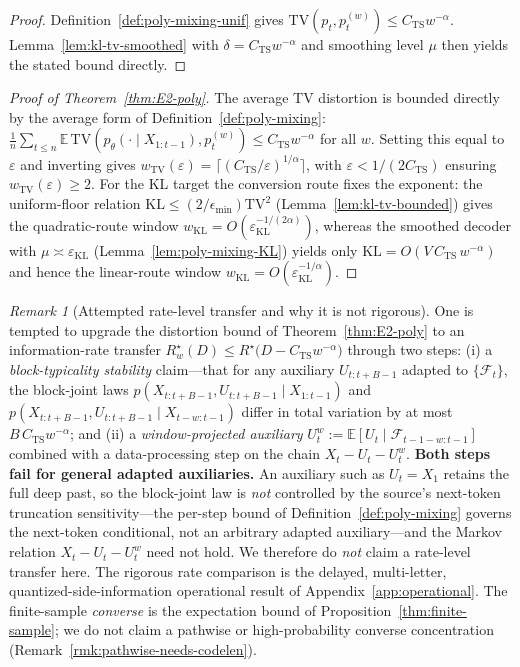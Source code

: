 \documentclass[11pt]{article}
\newcommand{\E}{\mathbb{E}}
\newcommand{\F}{\mathcal{F}}
\newcommand{\KLs}{\mathrm{KL}}
\newcommand{\TV}{\mathrm{TV}}
\theoremstyle{plain}
\theoremstyle{definition}
\theoremstyle{remark}
\newtheorem{remark}[theorem]{Remark}
\begin{document}
\begin{proof}
Definition~\ref{def:poly-mixing-unif} gives
$\TV(p_t, p_t^{(w)}) \leq C_{\mathrm{TS}} w^{-\alpha}$.
Lemma~\ref{lem:kl-tv-smoothed} with $\delta = C_{\mathrm{TS}}
w^{-\alpha}$ and smoothing level $\mu$ then yields the stated
bound directly.
\end{proof}

\begin{proof}[Proof of Theorem~\ref{thm:E2-poly}]
The average TV distortion is bounded directly by the average form of
Definition~\ref{def:poly-mixing}:
$\frac1n\sum_{t\le n}\E\,\TV(p_\theta(\cdot\mid X_{1:t-1}), p_t^{(w)}) \le
C_{\mathrm{TS}} w^{-\alpha}$ for all $w$. Setting this equal to
$\varepsilon$ and inverting gives
$w_{\TV}(\varepsilon)=\lceil (C_{\mathrm{TS}}/\varepsilon)^{1/\alpha}\rceil$,
with $\varepsilon<1/(2C_{\mathrm{TS}})$ ensuring $w_{\TV}(\varepsilon)\ge2$.
For the KL target the conversion route fixes the exponent: the
uniform-floor relation $\KLs \le (2/\epsilon_{\min})\TV^2$
(Lemma~\ref{lem:kl-tv-bounded}) gives the quadratic-route window
$w_{\KLs} = O(\varepsilon_{\KLs}^{-1/(2\alpha)})$, whereas the smoothed
decoder with $\mu \asymp \varepsilon_{\KLs}$
(Lemma~\ref{lem:poly-mixing-KL}) yields only
$\KLs = O(V\,C_{\mathrm{TS}}\,w^{-\alpha})$ and hence the linear-route
window $w_{\KLs} = O(\varepsilon_{\KLs}^{-1/\alpha})$.
\end{proof}

\begin{remark}[Attempted rate-level transfer and why it is not rigorous]
\label{rmk:failed-rate-transfer}
One is tempted to upgrade the distortion bound of
Theorem~\ref{thm:E2-poly} to an information-rate transfer
$R^\star_w(D)\le R^\star\!\bigl(D-C_{\mathrm{TS}}w^{-\alpha}\bigr)$ through
two steps: (i) a \emph{block-typicality stability} claim---that for any
auxiliary $U_{t:t+B-1}$ adapted to $\{\F_t\}$, the block-joint laws
$p(X_{t:t+B-1},U_{t:t+B-1}\mid X_{1:t-1})$ and
$p(X_{t:t+B-1},U_{t:t+B-1}\mid X_{t-w:t-1})$ differ in total variation by
at most $B\,C_{\mathrm{TS}}w^{-\alpha}$; and (ii) a \emph{window-projected
auxiliary} $U_t^w:=\E[U_t\mid\F_{t-1-w:t-1}]$ combined with a
data-processing step on the chain $X_t-U_t-U_t^w$. \textbf{Both steps fail
for general adapted auxiliaries.} An auxiliary such as $U_t=X_1$ retains
the full deep past, so the block-joint law is \emph{not} controlled by the
source's next-token truncation sensitivity---the per-step bound of
Definition~\ref{def:poly-mixing} governs the next-token conditional, not an
arbitrary adapted auxiliary---and the Markov relation $X_t-U_t-U_t^w$ need
not hold. We therefore do \emph{not} claim a rate-level transfer here. The
rigorous rate comparison is the delayed, multi-letter,
quantized-side-information operational result of
Appendix~\ref{app:operational}. The finite-sample \emph{converse}
is the expectation bound of Proposition~\ref{thm:finite-sample}; we do
not claim a pathwise or high-probability converse concentration
(Remark~\ref{rmk:pathwise-needs-codelen}).
\end{remark}
\end{document}

